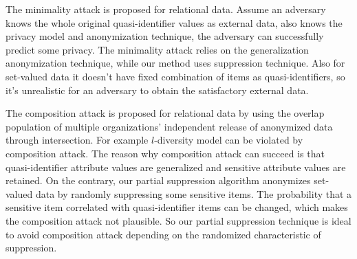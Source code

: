 The minimality attack \cite{Wong:2007:Minimality}
is proposed for relational data. Assume an adversary knows the whole original
quasi-identifier values as external data, also knows the privacy model and
anonymization technique,  the
adversary can successfully predict some privacy. The minimality attack relies
on the generalization anonymization technique, while our method uses
suppression technique. Also for set-valued data it doesn't have fixed
combination of items as quasi-identifiers, so it's unrealistic for an
adversary to obtain the satisfactory external data.

The composition attack \cite{Ganta:2008:Composition} is proposed for relational data by using the overlap population of multiple organizations' independent release of anonymized data through intersection. For example $l$-diversity \cite{Ganta:2008:Composition} model can be violated by composition attack. 
The reason why composition attack can succeed is that quasi-identifier attribute values are generalized and sensitive attribute values are retained.
On the contrary, our partial suppression algorithm anonymizes set-valued data by randomly suppressing some sensitive items.  The probability that a sensitive item correlated with quasi-identifier items can be changed, which makes the composition attack not plausible. So our partial suppression technique is ideal to avoid composition attack depending on the randomized characteristic of suppression.

